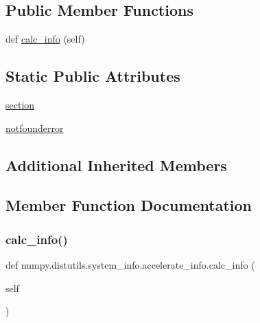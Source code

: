 \subsection*{Public Member Functions}
\begin{DoxyCompactItemize}
\item 
def \hyperlink{classnumpy_1_1distutils_1_1system__info_1_1accelerate__info_a404ab66f11384a491d57c422f98cab96}{calc\+\_\+info} (self)
\end{DoxyCompactItemize}
\subsection*{Static Public Attributes}
\begin{DoxyCompactItemize}
\item 
\hyperlink{classnumpy_1_1distutils_1_1system__info_1_1accelerate__info_a095d673d51f438ec9766a0bbf1b2308d}{section}
\item 
\hyperlink{classnumpy_1_1distutils_1_1system__info_1_1accelerate__info_a68ee34ef7b209dac6d8f28fa7a55b935}{notfounderror}
\end{DoxyCompactItemize}
\subsection*{Additional Inherited Members}


\subsection{Member Function Documentation}
\mbox{\label{classnumpy_1_1distutils_1_1system__info_1_1accelerate__info_a404ab66f11384a491d57c422f98cab96}} 
\subsubsection{\texorpdfstring{calc\+\_\+info()}{calc\_info()}}
{\footnotesize\ttfamily def numpy.\+distutils.\+system\+\_\+info.\+accelerate\+\_\+info.\+calc\+\_\+info (\begin{DoxyParamCaption}\item[{}]{self }\end{DoxyParamCaption})}



